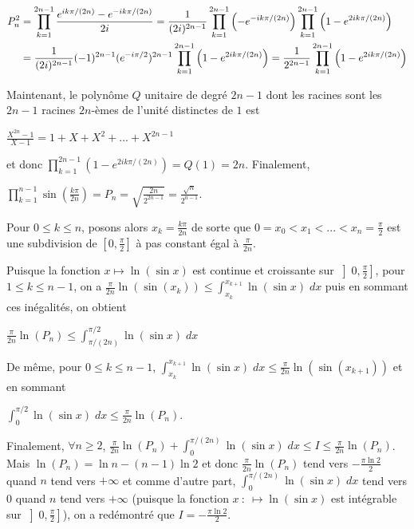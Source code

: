 {{\begin{align*}\ensuremath
P_n^2&=\prod_{k=1}^{2n-1}\frac{e^{ik\pi/(2n)}-e^{-ik\pi/(2n)}}{2i}=\frac{1}{(2i)^{2n-1}}\prod_{k=1}^{2n-1}\left(-e^{-ik\pi/(2n)}\right)\prod_{k=1}^{2n-1}\left(1-e^{2ik\pi/(2n)}\right)\\
 &=\frac{1}{(2i)^{2n-1}}(-1)^{2n-1}(e^{-i\pi/2})^{2n-1}\prod_{k=1}^{2n-1}\left(1-e^{2ik\pi/(2n)}\right)=   \frac{1}{2^{2n-1}}\prod_{k=1}^{2n-1}\left(1-e^{2ik\pi/(2n)}\right)
\end{align*}

Maintenant, le polynôme $Q$ unitaire de degré $2n-1$ dont les racines sont les $2n-1$ racines $2n$-èmes de l'unité distinctes de $1$ est

\begin{center}
$\frac{X^{2n}-1}{X-1}= 1+X+X^2+...+X^{2n-1}$
\end{center}

et  donc $\prod_{k=1}^{2n-1}\left(1-e^{2ik\pi/(2n)}\right)=Q(1)=2n$. Finalement,

\begin{center}
$\prod_{k=1}^{n-1}\sin\left(\frac{k\pi}{2n}\right)=P_n=\sqrt{\frac{2n}{2^{2n-1}}}=\frac{\sqrt{n}}{2^{n-1}}$.
\end{center}

Pour $0\leqslant k\leqslant n$, posons alors $x_k=\frac{k\pi}{2n}$ de sorte que $0 = x_0 < x_1< ...< x_n =\frac{\pi}{2}$ est une subdivision de $\left[0,\frac{\pi}{2}\right]$
à pas constant égal à $\frac{\pi}{2n}$.

Puisque la fonction $x\mapsto\ln(\sin x)$ est continue et croissante sur $\left]0,\frac{\pi}{2}\right]$, pour $1\leqslant k\leqslant n-1$, on a  $\frac{\pi}{2n}\ln(\sin(x_k))\leqslant\int_{x_k}^{x_{k+1}}\ln(\sin x)\;dx$ puis en sommant  ces inégalités, on obtient 

\begin{center}
$\frac{\pi}{2n}\ln(P_n)\leqslant\int_{\pi/(2n)}^{\pi/2}\ln(\sin x)\;dx$
\end{center}

De même, pour $0\leqslant k\leqslant n-1$,  $\int_{x_k}^{x_{k+1}}\ln(\sin x)\;dx\leqslant\frac{\pi}{2n}\ln(\sin(x_{k+1}))$ et en sommant  

\begin{center}
$\int_{0}^{\pi/2}\ln(\sin x)\;dx\leqslant\frac{\pi}{2n}\ln(P_n)$.
\end{center}

Finalement,  $\forall n\geqslant2$, $\frac{\pi}{2n}\ln(P_n)+\int_{0}^{\pi/(2n)}\ln(\sin x)\;dx\leqslant I\leqslant\frac{\pi}{2n}\ln(P_n)$. Mais $\ln(P_n) =\ln n -(n-1)\ln2$ et donc  $\frac{\pi}{2n}\ln(P_n)$ tend vers $-\frac{\pi\ln2}{2}$ quand $n$ tend vers $+\infty$ et comme d'autre part, $\int_{0}^{\pi/(2n)}\ln(\sin x)\;dx$ tend vers $0$ quand $n$ tend vers $+\infty$ (puisque la fonction $x~:~\mapsto\ln(\sin x)$ est intégrable sur $\left]0,\frac{\pi}{2}\right]$), on a redémontré que $I = -\frac{\pi\ln2}{2}$.
}
}
